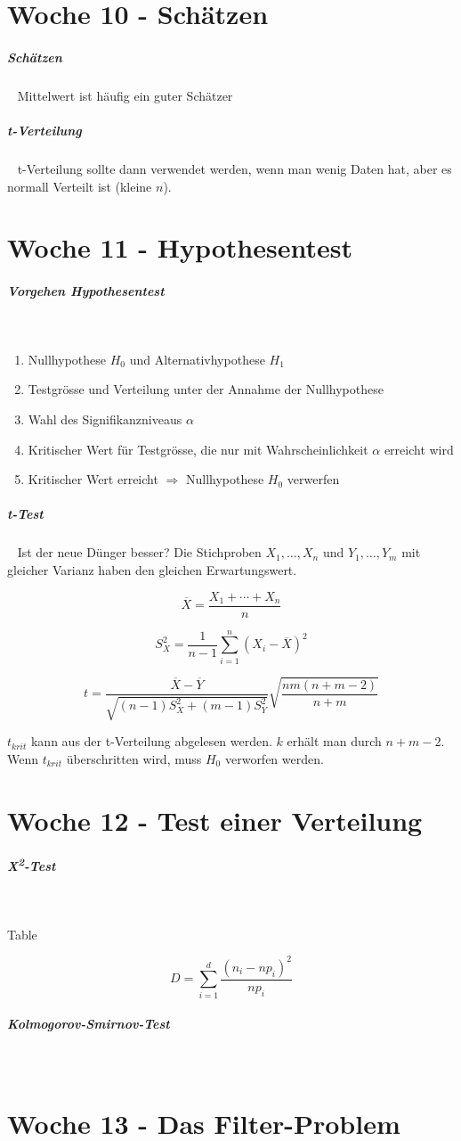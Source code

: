 \documentclass[11pt,twoside,landscape]{article}
\begin{document}
\section{Woche 10 - Schätzen}
\label{sec:org279adbe}
\subparagraph{Schätzen} \
\label{sec:org0c0e32d}
Mittelwert ist häufig ein guter Schätzer
\subparagraph{t-Verteilung} \
\label{sec:orgf34c24f}
t-Verteilung sollte dann verwendet werden, wenn man wenig Daten hat, aber es normall Verteilt ist (kleine \(n\)).
\section{Woche 11 - Hypothesentest}
\label{sec:orgffb32b5}
\subparagraph{Vorgehen Hypothesentest} \
\label{sec:org38d9832}
\begin{enumerate}
\item Nullhypothese \(H_0\) und Alternativhypothese \(H_1\)
\item Testgrösse und Verteilung unter der Annahme der Nullhypothese
\item Wahl des Signifikanzniveaus \(\alpha\)
\item Kritischer Wert für Testgrösse, die nur mit Wahrscheinlichkeit \(\alpha\) erreicht wird
\item Kritischer Wert erreicht \(\Rightarrow\) Nullhypothese \(H_0\) verwerfen
\end{enumerate}
\subparagraph{t-Test} \
\label{sec:org15cbada}
Ist der neue Dünger besser?
Die Stichproben \(X_1, \ldots, X_n\) und \(Y_1, \ldots, Y_m\) mit gleicher Varianz haben den gleichen Erwartungswert.

\[
\overline{X} = \frac{X_1 + \cdots + X_n}{n}
\]

\[
S_X^2 = \frac{1}{n-1}\sum_{i=1}^n(X_i-\overline{X})^2
\]

\[
t = \frac{\overline{X} - \overline{Y}}{\sqrt{(n-1)S_X^2 + (m-1)S_Y^2}}\sqrt{\frac{nm(n+m-2)}{n+m}}
\]

\(t_{krit}\) kann aus der t-Verteilung abgelesen werden.
\(k\) erhält man durch \(n+m-2\).
Wenn \(t_{krit}\) überschritten wird, muss \(H_0\) verworfen werden.
\section{Woche 12 - Test einer Verteilung}
\label{sec:org3e9e0b4}
\subparagraph{X\textsuperscript{2}-Test} \
\label{sec:org4a2b39e}

Table

\[
D = \sum_{i=1}^d\frac{(n_i-np_i)^2}{np_i}
\]
\subparagraph{Kolmogorov-Smirnov-Test} \
\label{sec:orgcf8b687}
\section{Woche 13 - Das Filter-Problem}
\label{sec:org966ac69}
\end{document}
